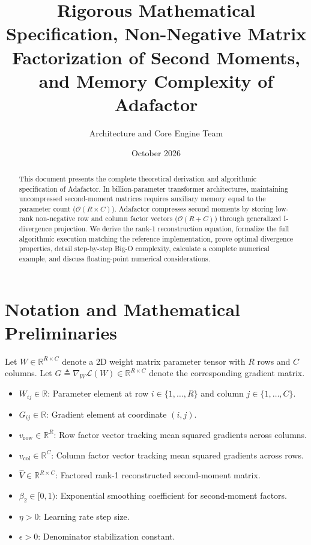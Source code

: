 \documentclass[11pt,a4paper]{article}
\title{\textbf{Rigorous Mathematical Specification, Non-Negative Matrix Factorization of Second Moments, and Memory Complexity of Adafactor}}
\author{Architecture and Core Engine Team}
\date{October 2026}
\theoremstyle{definition}
\begin{document}
\maketitle

\begin{abstract}
This document presents the complete theoretical derivation and algorithmic specification of Adafactor. In billion-parameter transformer architectures, maintaining uncompressed second-moment matrices requires auxiliary memory equal to the parameter count ($\mathcal{O}(R \times C)$). Adafactor compresses second moments by storing low-rank non-negative row and column factor vectors ($\mathcal{O}(R + C)$) through generalized I-divergence projection. We derive the rank-1 reconstruction equation, formalize the full algorithmic execution matching the reference implementation, prove optimal divergence properties, detail step-by-step Big-O complexity, calculate a complete numerical example, and discuss floating-point numerical considerations.
\end{abstract}

\section{Notation and Mathematical Preliminaries}

Let $W \in \mathbb{R}^{R \times C}$ denote a 2D weight matrix parameter tensor with $R$ rows and $C$ columns. Let $G \triangleq \nabla_W \mathcal{L}(W) \in \mathbb{R}^{R \times C}$ denote the corresponding gradient matrix.

\begin{itemize}
    \item $W_{ij} \in \mathbb{R}$: Parameter element at row $i \in \{1, \dots, R\}$ and column $j \in \{1, \dots, C\}$.
    \item $G_{ij} \in \mathbb{R}$: Gradient element at coordinate $(i, j)$.
    \item $v_{\text{row}} \in \mathbb{R}^R$: Row factor vector tracking mean squared gradients across columns.
    \item $v_{\text{col}} \in \mathbb{R}^C$: Column factor vector tracking mean squared gradients across rows.
    \item $\hat{V} \in \mathbb{R}^{R \times C}$: Factored rank-1 reconstructed second-moment matrix.
    \item $\beta_2 \in [0, 1)$: Exponential smoothing coefficient for second-moment factors.
    \item $\eta > 0$: Learning rate step size.
    \item $\epsilon > 0$: Denominator stabilization constant.
\end{itemize}
\end{document}
